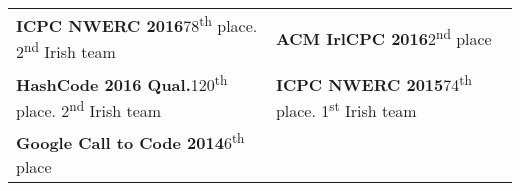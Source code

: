 \documentclass[a4paper, oneside, final]{scrartcl}
\newcommand{\fmtcompetition}[1]{\textbf{\small{#1}}}
\begin{document}
\begin{tabularx}{\columnwidth}{@{}X|X@{}}
\fmtcompetition{ICPC NWERC 2016}\hfill 78\textsuperscript{th} place. 2\textsuperscript{nd} Irish team&
\fmtcompetition{ACM IrlCPC 2016}\hfill 2\textsuperscript{nd} place\\ %
\fmtcompetition{HashCode 2016 Qual.}\hfill 120\textsuperscript{th} place. 2\textsuperscript{nd} Irish team&
\fmtcompetition{ICPC NWERC 2015}\hfill 74\textsuperscript{th} place. 1\textsuperscript{st} Irish team\\ %
\fmtcompetition{Google Call to Code 2014}\hfill 6\textsuperscript{th} place\\%
\end{tabularx}
\normalsize{}
\end{document}
